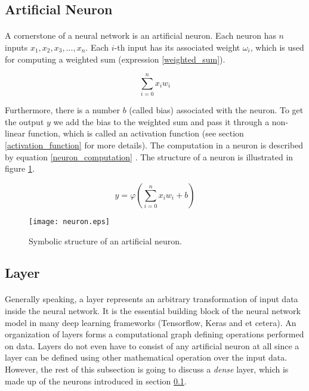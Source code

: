 \subsection{Artificial Neuron}\label{aritificial_neuron}
\paragraph{}
A cornerstone of a neural network is an artificial neuron. Each neuron has $n$ inputs $x_1, x_2, x_3, ... , x_n$. Each $i$-th input has its associated weight $\omega_i$, which is used for computing a weighted sum (expression \ref{weighted_sum}).

\begin{equation}
\sum_{i=0}^{n} x_i w_i
\label{weighted_sum}
\end{equation}  

Furthermore, there is a number $b$ (called bias) associated with the neuron. To get the output $y$ we add the bias to the weighted sum and pass it through a non-linear function, which is called an activation function (see section \ref{activation_function} for more details). The computation in a neuron is described by equation \ref{neuron_computation} \cite{Nielsen}. The structure of a neuron is illustrated in figure \ref{neuron_structure}.

\begin{equation}
y = \varphi(\sum_{i=0}^{n} x_i w_i + b)
\label{neuron_computation}
\end{equation}  

\begin{figure}[!h]
	\texttt{[image: neuron.eps]}
	\centering
	\caption{Symbolic structure of an artificial neuron.}
	\label{neuron_structure}
\end{figure}

\subsection{Layer}
\paragraph{}
Generally speaking, a layer represents an arbitrary transformation of input data inside the neural network. It is the essential building block of the neural network model in many deep learning frameworks (Tensorflow, Keras and et cetera). An organization of layers forms a computational graph defining operations performed on data. Layers do not even have to consist of any artificial neuron at all since a layer can be defined using other mathematical operation over the input data. However, the rest of this subsection is going to discuss a \textit{dense} layer, which is made up of the neurons introduced in section \ref{aritificial_neuron}.

